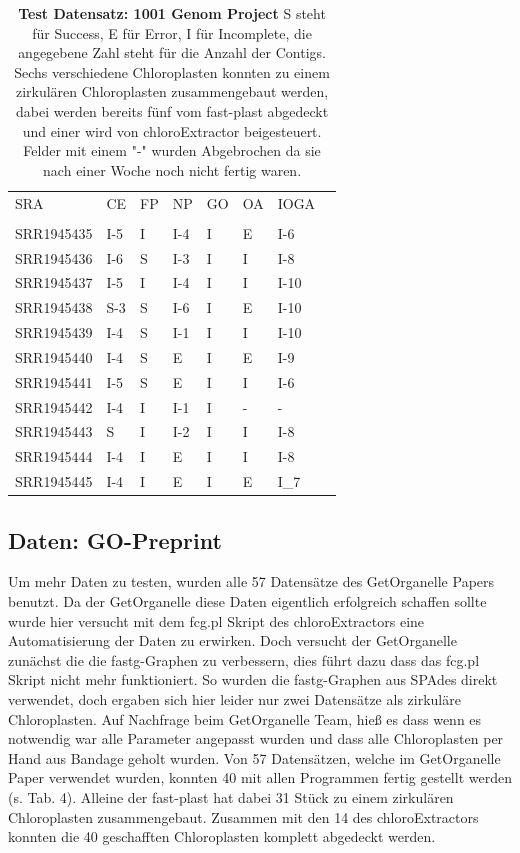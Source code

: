 \documentclass{scrartcl}
\begin{document}
\begin{table}[!h]
\caption[Test Datensatz: 1001 Genom Project, 11 Datensätze]{\textbf{Test Datensatz: 1001 Genom Project} S steht für Success, E für Error, I für Incomplete, die angegebene Zahl steht für die Anzahl der Contigs. Sechs verschiedene Chloroplasten konnten zu einem zirkulären Chloroplasten zusammengebaut werden, dabei werden bereits fünf vom fast-plast abgedeckt und einer wird von chloroExtractor beigesteuert. Felder mit einem "-" wurden Abgebrochen da sie nach einer Woche noch nicht fertig waren.}

\begin{center}
\begin{tabular}{llllllll}
SRA & CE & FP & NP & GO & OA & IOGA & \\
 &  &  &  &  &  &  & \\
\hline
SRR1945435 & I-5 & I & I-4 & I & E & I-6 & \\
SRR1945436 & I-6 & S & I-3 & I & I & I-8 & \\
SRR1945437 & I-5 & I & I-4 & I & I & I-10 & \\
SRR1945438 & S-3 & S & I-6 & I & E & I-10 & \\
SRR1945439 & I-4 & S & I-1 & I & I & I-10 & \\
SRR1945440 & I-4 & S & E & I & E & I-9 & \\
SRR1945441 & I-5 & S & E & I & I & I-6 & \\
SRR1945442 & I-4 & I & I-1 & I & - & - & \\
SRR1945443 & S & I & I-2 & I & I & I-8 & \\
SRR1945444 & I-4 & I & E & I & I & I-8 & \\
SRR1945445 & I-4 & I & E & I & E & I\_7 & \\
\end{tabular}
\end{center}
\end{table}

\subsection{Daten: GO-Preprint}
\label{sec-3-4}
Um mehr Daten zu testen, wurden alle 57 Datensätze des GetOrganelle Papers \footnotemark[22]{} benutzt. Da der GetOrganelle diese Daten eigentlich erfolgreich schaffen sollte
wurde hier versucht mit dem fcg.pl Skript des chloroExtractors eine Automatisierung der Daten zu erwirken. Doch versucht der GetOrganelle zunächst die die fastg-Graphen
zu verbessern, dies führt dazu dass das fcg.pl Skript nicht mehr funktioniert. So wurden die fastg-Graphen aus SPAdes direkt verwendet, doch ergaben sich hier leider nur
zwei Datensätze als zirkuläre Chloroplasten. Auf Nachfrage beim GetOrganelle Team, hieß es dass wenn es notwendig war alle Parameter angepasst wurden und dass alle 
Chloroplasten per Hand aus Bandage geholt wurden. 
Von 57 Datensätzen, welche im GetOrganelle Paper verwendet wurden, konnten 40 mit allen Programmen fertig gestellt werden (s. Tab. 4).
Alleine der fast-plast hat dabei 31 Stück zu einem zirkulären Chloroplasten zusammengebaut. Zusammen mit den 14 des chloroExtractors
konnten die 40 geschafften Chloroplasten komplett abgedeckt werden.
\end{document}
